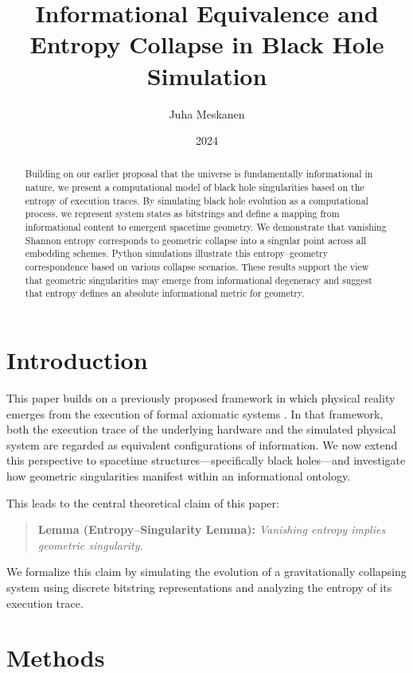 \documentclass[11pt]{article}
\title{Informational Equivalence and Entropy Collapse in Black Hole Simulation}
\author{Juha Meskanen}
\date{2024}
\begin{document}
\maketitle

\begin{abstract}
  Building on our earlier proposal that the universe is fundamentally informational in nature, we present a computational model of black hole singularities based on the entropy of execution traces. By simulating black hole evolution as a computational process, we represent system states as bitstrings and define a mapping from informational content to emergent spacetime geometry. We demonstrate that vanishing Shannon entropy corresponds to geometric collapse into a singular point across all embedding schemes. Python simulations illustrate this entropy--geometry correspondence based on various collapse scenarios. These results support the view that geometric singularities may emerge from informational degeneracy and suggest that entropy defines an absolute informational metric for geometry.
\end{abstract}

\section{Introduction}

This paper builds on a previously proposed framework in which physical reality emerges from the execution of formal axiomatic systems \cite{meskanen2019}. In that framework, both the execution trace of the underlying hardware and the simulated physical system are regarded as equivalent configurations of information. We now extend this perspective to spacetime structures—specifically black holes—and investigate how geometric singularities manifest within an informational ontology.


This leads to the central theoretical claim of this paper:

\begin{quote}
  \textbf{Lemma (Entropy--Singularity Lemma):} \emph{Vanishing entropy implies geometric singularity.}
\end{quote}

We formalize this claim by simulating the evolution of a gravitationally collapsing system using discrete bitstring representations and analyzing the entropy of its execution trace.

\section{Methods}
\end{document}
